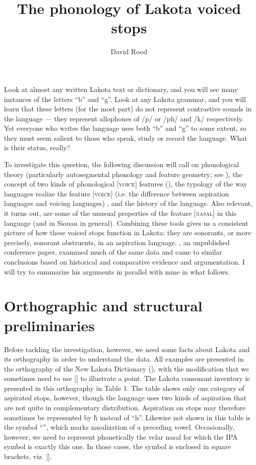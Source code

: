 \documentclass[output=paper]{LSP/langsci}
\author{David Rood}
\title{The phonology of Lakota voiced stops}
\begin{document}
Look at almost any written Lakota text or dictionary, and you will see many instances of the letters ``b'' and ``g''. Look at any Lakota grammar, and you will learn that these letters (for the most part) do not represent contrastive sounds in the language --- they represent allophones of /p/ or /ph/ and /k/ respectively. Yet everyone who writes the language uses both ``b'' and ``g'' to some extent, so they must seem salient to those who speak, study or record the language. What is their status, really?

To investigate this question, the following discussion will call on phonological theory (particularly autosegmental phonology and feature geometry; see \citet{Clements1985}), the concept of two kinds of phonological [\textsc{voice}] features (\citealt{Rice1993}), the typology of the way languages realize the feature [\textsc{voice}] (i.e. the difference between aspiration languages and voicing languages) \citep{RingenEtAl2013}, and the history of the language. Also relevant, it turns out, are some of the unusual properties of the feature [\textsc{nasal}] in this language (and in Siouan in general). Combining these tools gives us a consistent picture of how these voiced stops function in Lakota: they are sonorants, or more precisely, sonorant obstruents, in an aspiration language. \citet{Rankin2001}, an unpublished conference paper, examined much of the same data and came to similar conclusions based on historical and comparative evidence and argumentation. I will try to summarize his arguments in parallel with mine in what follows.

\section{Orthographic and structural preliminaries}

Before tackling the investigation, however, we need some facts about Lakota and its orthography in order to understand the data. All examples are presented in the orthography of the New Lakota Dictionary (\citealt{Ullrich2012}), with the modification that we sometimes need to use [] to illustrate a point. The Lakota consonant inventory is presented in this orthography in Table 1. The table shows only one category of aspirated stops, however, though the language uses two kinds of aspiration that are not quite in complementary distribution. Aspiration on stops may therefore sometimes be represented by \v{h} instead of ``h''. Likewise not shown in this table is the symbol ``'', which marks nasalization of a preceding vowel. Occasionally, however, we need to represent phonetically the velar nasal for which the IPA symbol is exactly this one. In those cases, the symbol is enclosed in square brackets, viz. [].
\end{document}
